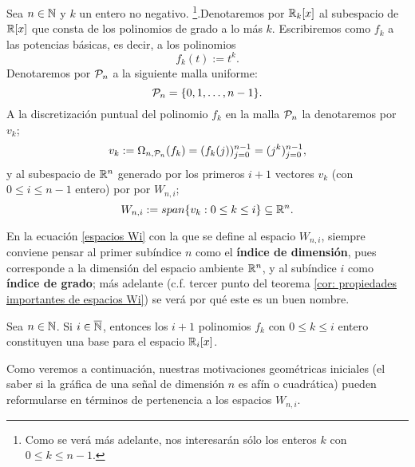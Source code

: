 \begin{notacion} \label{notacion: Pn, fk, Wi, vk}
Sea $n \in \mathbb{N}$ y $k$ un entero no negativo.
\footnote{Como se verá más adelante, 
nos interesarán sólo los enteros $k$
con $0 \leq k \leq n-1$.}.Denotaremos 
por $\mathbb{R}_{k}[x]$ al subespacio de $\mathbb{R}[x]$
que consta de los polinomios de grado a lo más $k$.
\noindent
Escribiremos como $f_{k}$ 
a las potencias básicas,
es decir, a los polinomios
\begin{equation}
\label{fk}
f_{k}(t):=t^{k}.
\end{equation}
Denotaremos por $\mathcal{P}_{n}$ a la siguiente
malla uniforme:
\begin{equation}
\label{malla Pn}
\mathcal{P}_{n}=\{ 0, 1, \ldots , n-1 \}.
\end{equation}
A la discretización puntual del
polinomio $f_{k}$ en la malla 
$\mathcal{P}_{n}$
la denotaremos por $v_{k}$;
\begin{equation}
\label{vectores vk}
v_{k}:= \Omega_{n, \mathcal{P}_{n}}(f_{k})
=(f_{k}(j))_{j=0}^{n-1}=(j^{k})_{j=0}^{n-1},
\end{equation}
y al subespacio de $\mathbb{R}^{n}$ generado por los
primeros $i+1$ vectores $v_{k}$
(con $0 \leq i \leq n-1$ entero)
por por $W_{n,i}$;
\begin{equation}
\label{espacios Wi}
W_{n,i} := span\{ v_{k} : 0 \leq k \leq i \} \subseteq \mathbb{R}^{n}.
\end{equation}
\end{notacion}


En la ecuación \eqref{espacios Wi} con la que se
define al espacio $W_{n,i}$,
siempre conviene pensar al primer subíndice $n$
como el \textbf{índice de dimensión}, pues corresponde
a la dimensión del espacio ambiente $\mathbb{R}^{n}$,
y al subíndice $i$ como \textbf{índice de grado};
más adelante (c.f. tercer punto del teorema 
\ref{cor: propiedades importantes de espacios Wi}) 
se verá por qué este es un buen nombre.



\begin{obs} \label{obs:independencia lineal polinomios}
Sea $n \in \mathbb{N}$. Si $i \in \overline{\mathbb{N}}$, entonces
los $i+1$ polinomios
$f_{k}$ con $0 \leq k \leq i$ entero
constituyen una base para el espacio $\mathbb{R}_{i}[x]$.
\end{obs}


\noindent
Como veremos a continuación, 
nuestras motivaciones geométricas
iniciales (el saber si la gráfica de una señal
de dimensión $n$ es afín o cuadrática) 
pueden reformularse en términos
de pertenencia a los espacios $W_{n,i}$.



